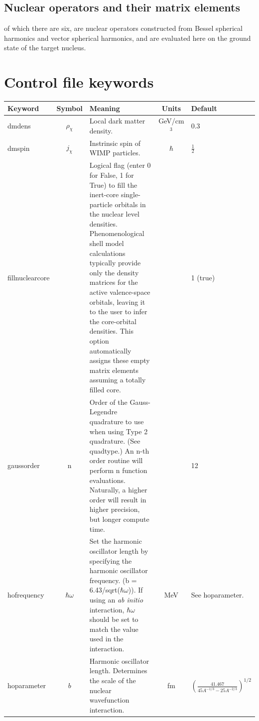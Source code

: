 \documentclass[11pt]{article}
\begin{document}
\subsection{Nuclear operators and their matrix elements}
of which there are six, are nuclear operators constructed from Bessel 
spherical harmonics and vector spherical harmonics, and are evaluated here on 
the ground state of the target nucleus.

\section{Control file keywords}\label{cfk}

\begin{longtable}{| l | c | p{2.5in} | c | l | }
  \hline Keyword & Symbol & Meaning & Units & Default \\

  \hline dmdens & $\rho_\chi$ & Local dark matter density. & GeV/cm$^3$ & 0.3\\

  \hline dmspin & $j_\chi$ & Instrinsic spin of WIMP particles. & $\hbar$ &
  $\frac{1}{2}$ \\

  \hline fillnuclearcore & & Logical flag (enter 0 for False, 1 for True) to fill the
  inert-core single-particle orbitals in the nuclear level densities.
  Phenomenological shell model calculations typically provide only the density
  matrices for the active valence-space orbitals, leaving it to the user to
  infer the core-orbital densities. This option automatically assigns these
  empty matrix elements assuming a totally filled core. & & 1 (true)\\
  
  \hline gaussorder & n & Order of the Gauss-Legendre quadrature to use when using Type 2 quadrature. (See quadtype.) An n-th order routine will perform n function evaluations.  Naturally, a higher order will result in higher precision, but longer compute time. & & 12\\

  \hline hofrequency & $\hbar \omega$ & Set the harmonic oscillator length by
  specifying the harmonic oscillator frequency. (b = 6.43/sqrt($\hbar\omega$)).
  If using an \textit{ab initio} interaction, $\hbar \omega$ should be set to
  match the value used in the interaction.
              & MeV & See hoparameter.\\

  \hline hoparameter & $b$ & Harmonic oscillator length. Determines the scale of the
  nuclear wavefunction interaction. & fm &
  $(\frac{41.467}{45A^{-1/3}-25A^{-2/3}})^{1/2}$  \\


\end{longtable}
\end{document}

